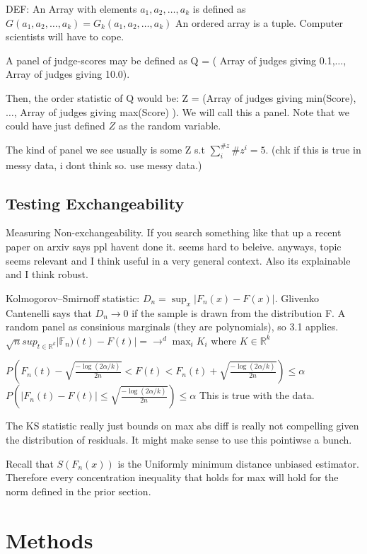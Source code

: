 \documentclass{article}
\begin{document}
DEF: An Array with elements $a_1,a_2,\dots,a_k $ is defined as $G(a_1,a_2,\dots,a_k) = G_k(a_1,a_2,\dots,a_k) $
An ordered array is a tuple. Computer scientists will have to cope.

A panel of judge-scores may be defined as Q = ( Array of judges giving 0.1,$ \dots$, Array of judges giving 10.0).

Then, the order statistic of Q would be: Z = (Array of judges giving min(Score),$\dots$, Array of judges giving max(Score) ). We will call this a panel. Note that we could have just defined $Z$ as the random variable.

The kind of panel we see usually is some Z s.t $\sum_i^{\#z} \#z^i = 5 $.
(chk if this is true in messy data, i dont think so. use messy data.)
\subsection{Testing Exchangeability}
Measuring Non-exchangeability. If you search something like that up a recent paper on arxiv says ppl havent done it. seems hard to beleive. anyways, topic seems relevant and I think useful in a very general context. Also its explainable and I think robust.

\cite{Naaman21}
Kolmogorov–Smirnoff statistic: $D_n = \sup_x |F_n(x) - F(x)| $.
Glivenko Cantenelli says that $D_n \rightarrow 0$ if the sample is drawn from the distribution F.
A random panel as consinious marginals (they are polynomials), so 3.1 applies.
$\sqrt{n} sup_{t\in \mathbb{R}^k}| \mathbb{F}_n)(t) - F(t) | = \rightarrow^d \max_i K_i$ where $K\in \mathbb{R}^k$

$P( F_n(t) - \sqrt{\frac{-\log(2\alpha/ k)}{2n}} < F(t) < F_n(t) + \sqrt{\frac{-\log(2\alpha/k)}{2n}} ) \leq \alpha $ 
$P( |F_n(t) - F(t)|\leq \sqrt{\frac{-\log(2\alpha/ k)}{2n}} ) \leq \alpha $ 
This is true with the data.

The KS statistic really just bounds on max abs diff is really not compelling given the distribution of residuals. It might make sense to use this pointiwse a bunch.

Recall that  $S(F_n(x))$ is the Uniformly minimum distance unbiased estimator. Therefore every concentration inequality that holds for max will hold for the norm defined in the prior section.



\section{Methods}
\end{document}
